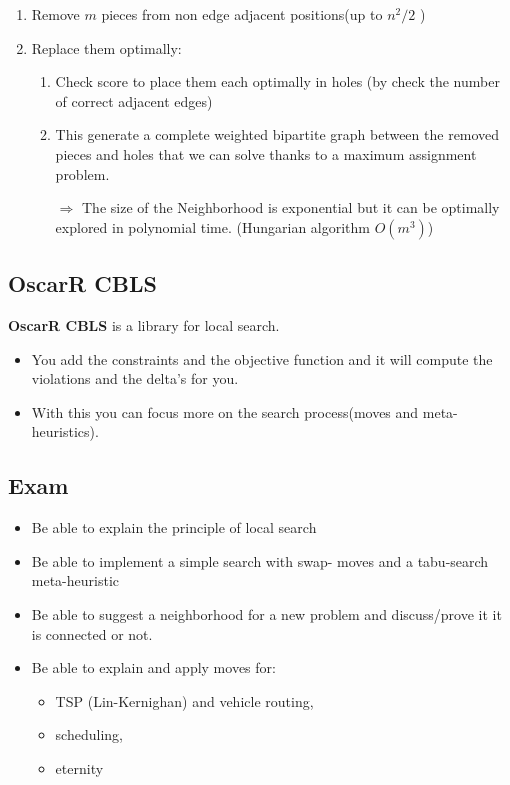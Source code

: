 \begin{enumerate}
    \item Remove $m$ pieces from non edge adjacent positions(up to $n^2/2$ ) 
    \item Replace them optimally:

        \begin{enumerate}
            \item Check score to place them each optimally in holes (by
                check the number of correct adjacent edges)
            \item This generate a complete weighted bipartite graph
                between the removed pieces and holes that we can solve
                thanks to a maximum assignment problem.

                $\Rightarrow$ The size of the Neighborhood is
                exponential but it can be optimally explored in
                polynomial time. (Hungarian algorithm $O(m^3)$)
                \end{enumerate}
\end{enumerate}


\subsection{OscarR CBLS}
\textbf{OscarR CBLS} is a library for local search.
\begin{itemize}
    \item You add the constraints and the objective function and it will
        compute the violations and the delta's for you.
    \item With this you can focus more on the search process(moves and meta-heuristics).
\end{itemize}

\subsection{Exam}
\begin{itemize}
    \item Be able to explain the principle of local search
    \item Be able to implement a simple search with swap-
        moves and a tabu-search meta-heuristic
    \item Be able to suggest a neighborhood for a new problem
        and discuss/prove it it is connected or not.
    \item Be able to explain and apply moves for:
        \begin{itemize}
            \item TSP (Lin-Kernighan) and vehicle routing,
            \item scheduling,
            \item eternity
        \end{itemize}
\end{itemize}
